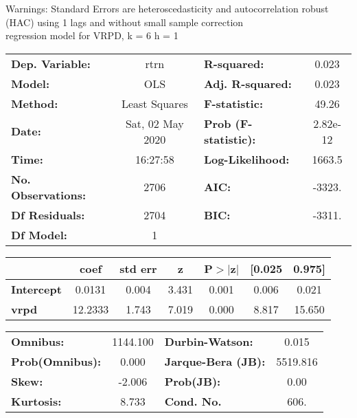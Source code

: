Warnings: \newline
 [1] Standard Errors are heteroscedasticity and autocorrelation robust (HAC) using 1 lags and without small sample correction\\ 

regression model for VRPD, k = 6 h = 1\begin{center}
\begin{tabular}{lclc}
\toprule
\textbf{Dep. Variable:}    &       rtrn       & \textbf{  R-squared:         } &     0.023   \\
\textbf{Model:}            &       OLS        & \textbf{  Adj. R-squared:    } &     0.023   \\
\textbf{Method:}           &  Least Squares   & \textbf{  F-statistic:       } &     49.26   \\
\textbf{Date:}             & Sat, 02 May 2020 & \textbf{  Prob (F-statistic):} &  2.82e-12   \\
\textbf{Time:}             &     16:27:58     & \textbf{  Log-Likelihood:    } &    1663.5   \\
\textbf{No. Observations:} &        2706      & \textbf{  AIC:               } &    -3323.   \\
\textbf{Df Residuals:}     &        2704      & \textbf{  BIC:               } &    -3311.   \\
\textbf{Df Model:}         &           1      & \textbf{                     } &             \\
\bottomrule
\end{tabular}
\begin{tabular}{lcccccc}
                   & \textbf{coef} & \textbf{std err} & \textbf{z} & \textbf{P$> |$z$|$} & \textbf{[0.025} & \textbf{0.975]}  \\
\midrule
\textbf{Intercept} &       0.0131  &        0.004     &     3.431  &         0.001        &        0.006    &        0.021     \\
\textbf{vrpd}      &      12.2333  &        1.743     &     7.019  &         0.000        &        8.817    &       15.650     \\
\bottomrule
\end{tabular}
\begin{tabular}{lclc}
\textbf{Omnibus:}       & 1144.100 & \textbf{  Durbin-Watson:     } &    0.015  \\
\textbf{Prob(Omnibus):} &   0.000  & \textbf{  Jarque-Bera (JB):  } & 5519.816  \\
\textbf{Skew:}          &  -2.006  & \textbf{  Prob(JB):          } &     0.00  \\
\textbf{Kurtosis:}      &   8.733  & \textbf{  Cond. No.          } &     606.  \\
\bottomrule
\end{tabular}
\end{center}

